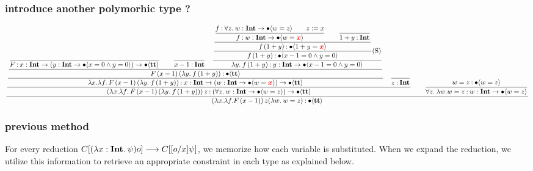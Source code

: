 \documentclass{article}
\begin{document}
\subsubsection{introduce another polymorhic type ?}
\small
\begin{equation*}
    \dfrac{
    \dfrac{
        \dfrac{
            \dfrac{
                    \dfrac{
                    }{
                    F \mathbin{:} {x} : \textbf{Int} \to ({y} : \textbf{Int} \to \bullet \langle x = 0 \wedge y = 0 \rangle) \to \bullet \langle \textbf{tt} \rangle
                    }
                    \qquad
                    \dfrac{}{
                    x - 1 \mathbin{:} \textbf{Int}
                    }
                \quad
                \dfrac{
                    \dfrac{
                        \dfrac{
                            \dfrac{f \mathbin{:} \forall z.\: {w} : \textbf{Int} \to \bullet \langle w = z \rangle\qquad z := x}{
                                f \mathbin{:} {w} : \textbf{Int} \to \bullet \langle w=\textcolor{red}{\boldsymbol x} \rangle
                            }
                            \qquad
                            \dfrac{}{
                                1+y \mathbin{:} \textbf{Int}
                            }
                        }{
                            f\,(1+y) \mathbin{:} \bullet \langle 1+y=\textcolor{red}{\boldsymbol x} \rangle
                        }
                    } {
                        f\,(1+y) \mathbin{:} \bullet \langle x - 1 = 0 \wedge y = 0 \rangle
                    }\text{(S)}
                } {
                    \lambda y.\: f\,(1+y) \mathbin{:} {y} : \textbf{Int} \to \bullet \langle x - 1 = 0 \wedge y = 0 \rangle
                }
            }{
                F\, (x-1)\, (\lambda y.\: f\,(1+y))  \mathbin{:} \bullet \langle \textbf{tt} \rangle
            }
        }{
            \lambda x. \lambda f.\: F\, (x-1)\, (\lambda y.\: f\,(1+y)) \mathbin{:} {x} : \textbf{Int} \to ({w} : \textbf{Int} \to \bullet \langle w = \textcolor{red}{\boldsymbol x} \rangle) \to \bullet \langle \textbf{tt} \rangle
        }
        \quad
        \dfrac{}{
        z \mathbin{:} \textbf{Int}
        }
        }{
            (\lambda x. \lambda f.\: F\, (x-1)\, (\lambda y.\: f\,(1+y)))\, z \mathbin{:} (\forall z.\: {w} : \textbf{Int} \to \bullet \langle w = z \rangle) \to \bullet \langle \textbf{tt} \rangle
        }
        \qquad 
        \dfrac{
            w = z \mathbin{:} \bullet \langle  w = z \rangle
        }{
            \forall z.\: \lambda w. w = z \mathbin{:} {w} : \textbf{Int} \to \bullet \langle w = z \rangle
        }
    }{
        (\lambda x. \lambda f. F\, (x-1))\, z (\lambda w.\: w = z) \mathbin{:} \bullet \langle \textbf{tt} \rangle
    }
\end{equation*}

\subsubsection{previous method}


For every reduction \( C[(\lambda x:\textbf{Int}.\: \psi) o] \longrightarrow C[[o/x]\psi] \), we memorize how each variable is substituted. 
When we expand the reduction, we utilize this information to retrieve an appropriate constraint in each type as explained below.
\end{document}
